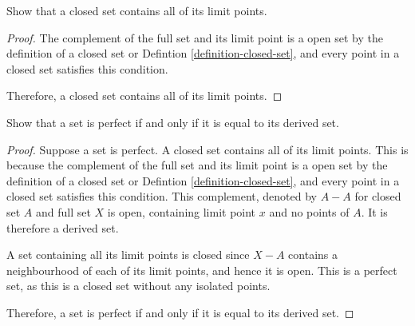 \begin{exercise}
	Show that a closed set contains all of its limit points.
	\label{exercise-closed-set-all-limit-points}
\end{exercise}

\begin{proof}
	The complement of the full set and its limit point is a open set by the definition of a closed set or Defintion \ref{definition-closed-set}, and every point in a closed set satisfies this condition.
	
	Therefore, a closed set contains all of its limit points.
\end{proof}

\begin{exercise}
	Show that a set is perfect if and only if it is equal to its derived set.
	\label{exercise-perfect-set-equal-derived set}
\end{exercise}

\begin{proof}
	Suppose a set is perfect.
	A closed set contains all of its limit points.
	This is because the complement of the full set and its limit point is a open set by the definition of a closed set or Defintion \ref{definition-closed-set}, and every point in a closed set satisfies this condition. This complement, denoted by $A - A$ for closed set $A$ and full set $X$ is open, containing limit point $x$ and no points of $A$. It is therefore a derived set.
	
	A set containing all its limit points is closed since $X - A$ contains a neighbourhood of each of its limit points, and hence it is open. This is a perfect set, as this is a closed set without any isolated points.

	Therefore, a set is perfect if and only if it is equal to its derived set.
\end{proof}
